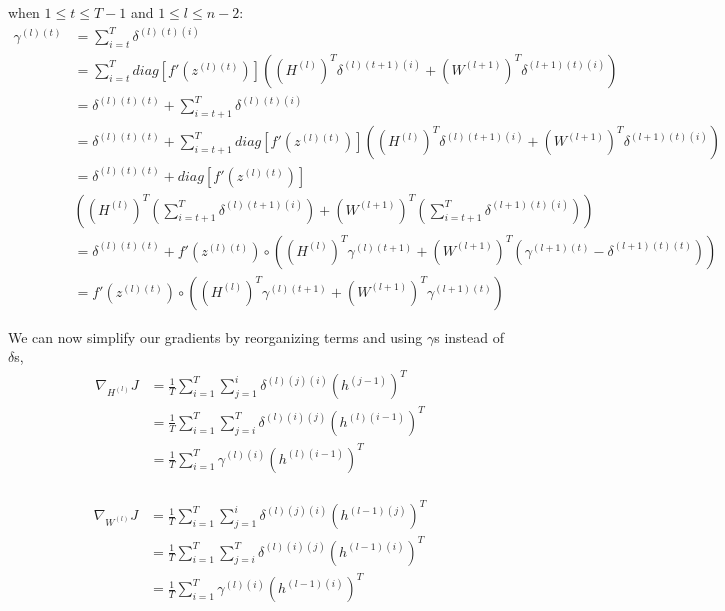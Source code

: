 \documentclass{article}
\begin{document}
	when $1 \le t \le T-1$ and $1 \le l \le n-2$:
	\begin{equation}
	\begin{aligned}
		\gamma^{(l)(t)} 
		&= \sum_{i=t}^{T} \delta^{(l)(t)(i)} \\
		&= \sum_{i=t}^{T} diag[f'(z^{(l)(t)})] ((H^{(l)})^T \delta^{(l)(t+1)(i)} + (W^{(l+1)})^T \delta^{(l+1)(t)(i)}) \\
		&= \delta^{(l)(t)(t)} + \sum_{i=t+1}^{T} \delta^{(l)(t)(i)} \\
		&= \delta^{(l)(t)(t)} + \sum_{i=t+1}^{T} diag[f'(z^{(l)(t)})] ((H^{(l)})^T \delta^{(l)(t+1)(i)} + (W^{(l+1)})^T \delta^{(l+1)(t)(i)}) \\
		&= \delta^{(l)(t)(t)} + diag[f'(z^{(l)(t)})] \\
		&\left( (H^{(l)})^T \left(\sum_{i=t+1}^{T} \delta^{(l)(t+1)(i)}\right) + (W^{(l+1)})^T \left(\sum_{i=t+1}^{T} \delta^{(l+1)(t)(i)}\right) \right) \\		
		&= \delta^{(l)(t)(t)} + f'(z^{(l)(t)}) \circ ( (H^{(l)})^T \gamma^{(l)(t+1)} + (W^{(l+1)})^T (\gamma^{(l+1)(t)} - \delta^{(l+1)(t)(t)})) \\
		&= f'(z^{(l)(t)}) \circ ( (H^{(l)})^T \gamma^{(l)(t+1)} + (W^{(l+1)})^T \gamma^{(l+1)(t)})
	\end{aligned}
	\end{equation}
	
	We can now simplify our gradients by reorganizing terms and using $\gamma$s instead of $\delta$s,
	\begin{equation}
	\begin{aligned}
		\nabla_{H^{(l)}} J 
		&= \frac{1}{T}\sum_{i=1}^{T} \sum_{j=1}^{i} \delta^{(l)(j)(i)}  (h^{(j-1)})^T\\
		&= \frac{1}{T} \sum_{i=1}^{T} \sum_{j=i}^{T} \delta^{(l)(i)(j)}  (h^{(l)(i-1)})^T\\
		&= \frac{1}{T} \sum_{i=1}^{T} \gamma^{(l)(i)}  (h^{(l)(i-1)})^T\\
	\end{aligned}
	\end{equation}
	
	\begin{equation}
	\begin{aligned}
		\nabla_{W^{(l)}} J 
		&= \frac{1}{T} \sum_{i=1}^{T} \sum_{j=1}^{i} \delta^{(l)(j)(i)}  (h^{(l-1)(j)})^T\\
		&= \frac{1}{T} \sum_{i=1}^{T} \sum_{j=i}^{T} \delta^{(l)(i)(j)}  (h^{(l-1)(i)})^T\\
		&= \frac{1}{T} \sum_{i=1}^{T} \gamma^{(l)(i)}  (h^{(l-1)(i)})^T\\
	\end{aligned}
	\end{equation}
	
\end{document}
